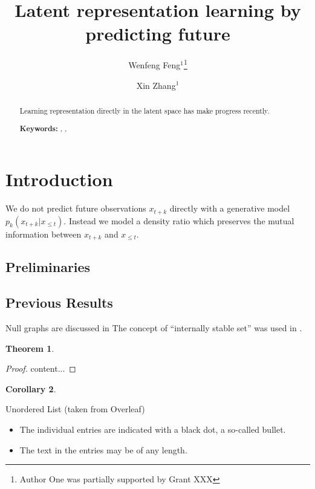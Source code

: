 \documentclass[a4paper]{article}
\title{Latent representation learning by predicting future}
\author{Wenfeng Feng$^1$\thanks{Author One was partially supported by Grant XXX} \and Xin Zhang$^1$}
\date{
}
\theoremstyle{plain}
\newtheorem{theorem}{Theorem}
\newtheorem{corollary}[theorem]{Corollary}
\theoremstyle{definition}
\begin{document}
	\maketitle
	
	\begin{abstract}
		Learning representation directly in the latent space has make progress recently.
		
		\noindent\textbf{Keywords:} , , 
	\end{abstract}

	\tableofcontents
	
	\section{Introduction}
	\label{sec:intro}
	
	We do not predict future observations $x_{t+k}$ directly with a generative model $p_k(x_{t+k}|x_{\le t})$.
	Instead we model a density ratio which preserves the mutual information between $x_{t+k}$ and $x_{\le t}$.
	\cite{van2018representation}
	
	\subsection{Preliminaries}
	\label{sec:pre}
	
	\lipsum[3]
	
	\subsection{Previous Results}
	\label{sec:prev-results}
	
	Null graphs are discussed in \cite{HararyR74}
	The concept of ``internally stable set'' was used in \cite{Berge57, Berge58}.
	
	\begin{theorem}
		\label{thrm:1}
		\lipsum[4]
	\end{theorem}
	\begin{proof}
		content...
	\end{proof}

	\begin{corollary}
	\label{cor:1}
	
	\lipsum[5]
	\end{corollary}

	Unordered List (taken from Overleaf)
	\begin{itemize}
		\item The individual entries are indicated with a black dot, a so-called bullet.
		\item The text in the entries may be of any length.
	\end{itemize}
\end{document}
